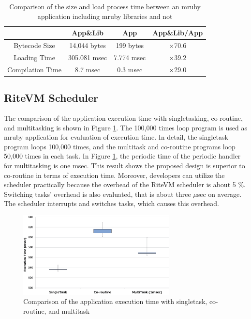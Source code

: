 \documentclass{sig-alternate-05-2015}
\begin{document}
\begin{table}[t]
    \centering
    \caption{Comparison of the size and load process time between an mruby application including mruby libraries and not}
    \scriptsize
    {\tabcolsep=0.1cm
    \begin{tabular}{c||c|c|c}
                            & App\&Lib     & App        &   App\&Lib/App  \\ \hline
          Bytecode Size     & 14,044 bytes & 199 bytes  &   $\times$70.6          \\ %
          Loading Time      & 305.081 msec & 7.774 msec &   $\times$39.2          \\
          Compilation Time  & 8.7 msec     & 0.3 msec   &   $\times$29.0          \\
    \end{tabular}
    }
    \label{tab:size_and_time}
\end{table}

\subsection{RiteVM Scheduler}
The comparison of the application execution time with singletasking, co-routine, and multitasking is shown in Figure \ref{fig:comparison_s_c_m}.
The 100,000 times loop program is used as mruby application for evaluation of execution time.
In detail, the singletask program loops 100,000 times, and the multitask and co-routine programs loop 50,000 times in each task.
In Figure \ref{fig:comparison_s_c_m}, the periodic time of the periodic handler for multitasking is one msec.
This result shows the proposed design is superior to co-routine in terms of execution time.
Moreover, developers can utilize the scheduler practically because the overhead of the RiteVM scheduler is about 5 \%.
Switching tasks' overhead is also evaluated, that is about three $\mu$sec on average.
The scheduler interrupts and switches tasks, which causes this overhead.

\begin{figure}[t]
    \centering
    \includegraphics[width=8cm,clip]{figure/comparison_s_c_m.eps}
    \caption{Comparison of the application execution time with singletask, co-routine, and multitask}
    \label{fig:comparison_s_c_m}
\end{figure}
\end{document}
